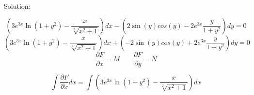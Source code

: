 \documentclass{article}
\begin{document}
    \begin{flushleft}
        Solution:
    \end{flushleft}
    \begin{equation}
        \left( 3e^{3x}\ln{(1+y^{2})}-\frac{x}{\sqrt[2]{x^{2}+1}} \right)dx 
        -
        \left(2\sin{(y)}cos{(y)}-2e^{3x}\frac{y}{1+y^{2}}\right)dy = 0
    \end{equation}
    \begin{equation}
        \left( 3e^{3x}\ln{(1+y^{2})}-\frac{x}{\sqrt[2]{x^{2}+1}} \right)dx 
        +
        \left(-2\sin{(y)}cos{(y)}+2e^{3x}\frac{y}{1+y^{2}}\right)dy = 0
    \end{equation}
    \begin{equation}
        \frac{\partial F}{\partial x} = M 
        \qquad
        \frac{\partial F}{\partial y} = N
    \end{equation} 

    \begin{equation}
            \int \frac{\partial F}{\partial x}dx 
            = 
            \int \left( 3e^{3x}\ln{(1+y^{2})}-\frac{x}{\sqrt[2]{x^{2}+1}} \right)dx
    \end{equation}
\end{document}
